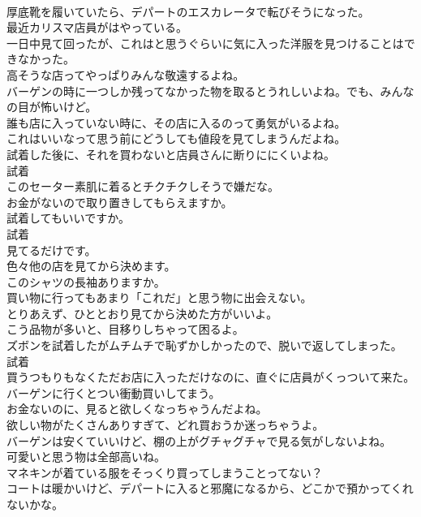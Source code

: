 \documentclass[8pt]{extreport}
\begin{document}
\begin{CJK}{UTF8}{min}
\\	厚底靴を履いていたら、デパートのエスカレータで転びそうになった。	
\\	最近カリスマ店員がはやっている。	
\\	一日中見て回ったが、これはと思うぐらいに気に入った洋服を見つけることはできなかった。	
\\	高そうな店ってやっぱりみんな敬遠するよね。	
\\	バーゲンの時に一つしか残ってなかった物を取るとうれしいよね。でも、みんなの目が怖いけど。	
\\	誰も店に入っていない時に、その店に入るのって勇気がいるよね。	
\\	これはいいなって思う前にどうしても値段を見てしまうんだよね。	
\\	試着した後に、それを買わないと店員さんに断りににくいよね。	
\\	試着
\\	このセーター素肌に着るとチクチクしそうで嫌だな。	
\\	お金がないので取り置きしてもらえますか。	
\\	試着してもいいですか。	
\\	試着
\\	見てるだけです。	
\\	色々他の店を見てから決めます。	
\\	このシャツの長袖ありますか。	
\\	買い物に行ってもあまり「これだ」と思う物に出会えない。	
\\	とりあえず、ひととおり見てから決めた方がいいよ。	
\\	こう品物が多いと、目移りしちゃって困るよ。	
\\	ズボンを試着したがムチムチで恥ずかしかったので、脱いで返してしまった。	
\\	試着
\\	買うつもりもなくただお店に入っただけなのに、直ぐに店員がくっついて来た。	
\\	バーゲンに行くとつい衝動買いしてまう。	
\\	お金ないのに、見ると欲しくなっちゃうんだよね。	
\\	欲しい物がたくさんありすぎて、どれ買おうか迷っちゃうよ。	
\\	バーゲンは安くていいけど、棚の上がグチャグチャで見る気がしないよね。	
\\	可愛いと思う物は全部高いね。	
\\	マネキンが着ている服をそっくり買ってしまうことってない？	
\\	コートは暖かいけど、デパートに入ると邪魔になるから、どこかで預かってくれないかな。	

\end{CJK}
\end{document}
